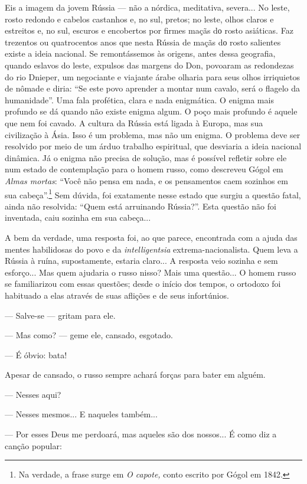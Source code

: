 Eis a imagem da jovem Rússia --- não a nórdica, meditativa, severa... No
leste, rosto redondo e cabelos castanhos e, no sul, pretos; no leste,
olhos claros e estreitos e, no sul, escuros e encobertos por firmes
maçãs dо rosto asiáticas. Faz trezentos ou quatrocentos anos que nesta
Rússia de maçãs dо rosto salientes existe a ideia nacional. Se
remontássemos às origens, antes dessa geografia, quando eslavos do
leste, expulsos das margens do Don, povoaram as redondezas do rio
Dnieper, um negociante e viajante árabe olharia para seus olhos
irriquietos de nômade e diria: ``Se este povo aprender a montar num
cavalo, será o flagelo da humanidade''. Uma fala profética, clara e nada
enigmática. O enigma mais profundo se dá quando não existe enigma algum.
O poço mais profundo é aquele que nem foi cavado. A cultura da Rússia
está ligada à Europa, mas sua civilização à Ásia. Isso é um problema,
mas não um enigma. O problema deve ser resolvido por meio de um árduo
trabalho espiritual, que desviaria a ideia nacional dinâmica. Já o
enigma não precisa de solução, mas é possível refletir sobre ele num
estado de contemplação para o homem russo, como descreveu Gógol em
\emph{Almas mortas}: ``Você não pensa em nada, e os pensamentos caem
sozinhos em sua cabeça''.\footnote{Na verdade, a frase surge em \emph{O
  capote,} conto escrito por Gógol em 1842.} Sem dúvida, foi exatamente
nesse estado que surgiu a questão fatal, ainda não resolvida: ``Quem
está arruinando Rússia?''. Esta questão não foi inventada, caiu sozinha
em sua cabeça...

A bem da verdade, uma resposta foi, ao que parece, encontrada com a
ajuda das mentes habilidosas do povo e da \emph{intelligentsia}
extrema-nacionalista. Quem leva a Rússia à ruína, supostamente, estaria
claro... A resposta veio sozinha e sem esforço... Mas quem ajudaria o
russo nisso? Mais uma questão... O homem russo se familiarizou com essas
questões; desde o início dos tempos, o ortodoxo foi habituado a elas
através de suas aflições e de seus infortúnios.

--- Salve-se --- gritam para ele.

--- Mas como? --- geme ele, cansado, esgotado.

--- É óbvio: bata!

Apesar de cansado, o russo sempre achará forças para bater em alguém.

--- Nesses aqui?

--- Nesses mesmos... E naqueles também...

--- Por esses Deus me perdoará, mas aqueles são dos nossos... É como diz
a canção popular:

